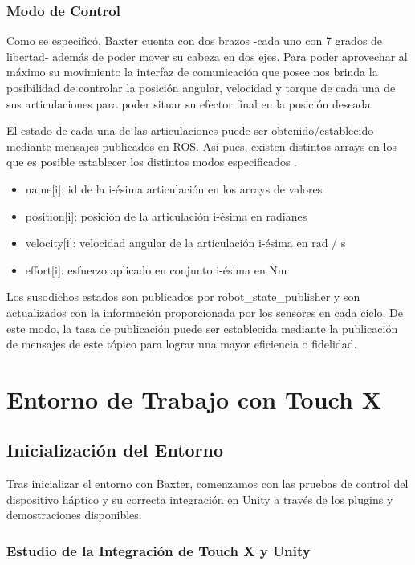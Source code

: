 \subsubsection{Modo de Control}

Como se especificó, Baxter cuenta con dos brazos -cada uno con 7 grados de libertad- además de poder mover su cabeza en dos ejes. Para poder aprovechar al máximo su movimiento la interfaz de comunicación que posee nos brinda la posibilidad de controlar la posición angular, velocidad y torque de cada una de sus articulaciones para poder situar su efector final en la posición deseada. 

El estado de cada una de las articulaciones puede ser obtenido/establecido mediante mensajes publicados en ROS. Así pues, existen distintos arrays en los que es posible establecer los distintos modos especificados \cite{72}. 

\begin{itemize}
    \item name[i]: id de la i-ésima articulación en los arrays de valores
    \item position[i]: posición de la articulación i-ésima en radianes
    \item velocity[i]: velocidad angular de la articulación i-ésima en rad / s
    \item effort[i]: esfuerzo aplicado en conjunto i-ésima en Nm
\end{itemize}

Los susodichos estados son publicados por robot\_state\_publisher y son actualizados con la información proporcionada por los sensores en cada ciclo. De este modo, la tasa de publicación puede ser establecida mediante la publicación de mensajes de este tópico para lograr una mayor eficiencia o fidelidad.

\section{Entorno de Trabajo con Touch X}

\subsection{Inicialización del Entorno}

Tras inicializar el entorno con Baxter, comenzamos con las pruebas de control del dispositivo háptico y su correcta integración en Unity a través de los plugins y demostraciones disponibles.

\subsubsection{Estudio de la Integración de Touch X y Unity}

